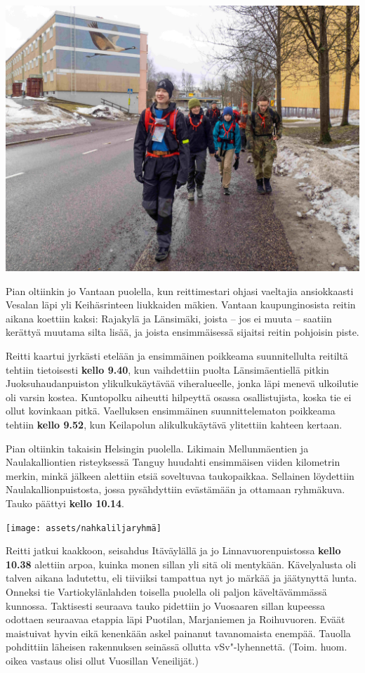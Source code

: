\begin{multicols}{2}
	\vspace*{0.32cm}
	\noindent\includegraphics[width=\linewidth]{assets/nahkaliljavantaa}

	Pian oltiinkin jo Vantaan puolella, kun reittimestari ohjasi vaeltajia
	ansiokkaasti Vesalan läpi yli Keihäsrinteen liukkaiden mäkien. Vantaan
	kaupunginosista reitin aikana koettiin kaksi: Rajakylä ja Länsimäki,
	joista – jos ei muuta – saatiin kerättyä muutama silta lisää, ja joista
	ensimmäisessä sijaitsi reitin pohjoisin piste.

	Reitti kaartui jyrkästi etelään ja ensimmäinen poikkeama suunnitellulta
	reitiltä tehtiin tietoisesti \textbf{kello 9.40}, kun vaihdettiin
	puolta Länsimäentiellä pitkin Juoksuhaudanpuiston ylikulkukäytävää
	viheralueelle, jonka läpi menevä ulkoilutie oli varsin kostea.
	Kuntopolku aiheutti hilpeyttä osassa osallistujista, koska tie ei ollut
	kovinkaan pitkä. Vaelluksen ensimmäinen suunnittelematon poikkeama
	tehtiin \textbf{kello 9.52}, kun Keilapolun alikulkukäytävä ylitettiin
	kahteen kertaan.

	Pian oltiinkin takaisin Helsingin puolella. Likimain Mellunmäentien ja
	Naulakalliontien risteyksessä Tanguy huudahti ensimmäisen viiden
	kilometrin merkin, minkä jälkeen alettiin etsiä soveltuvaa
	taukopaikkaa. Sellainen löydettiin Naulakallionpuistosta, jossa
	pysähdyttiin evästämään ja ottamaan ryhmäkuva. Tauko päättyi
	\textbf{kello 10.14}.

	\vspace*{0.32cm}
	\noindent\texttt{[image: assets/nahkaliljaryhmä]}

	Reitti jatkui kaakkoon, seisahdus Itäväylällä ja jo
	Linnavuorenpuistossa \textbf{kello 10.38} alettiin arpoa, kuinka monen
	sillan yli sitä oli mentykään. Kävelyalusta oli talven aikana
	ladutettu, eli tiiviiksi tampattua nyt jo märkää ja jäätynyttä lunta.
	Onneksi tie Vartiokylänlahden toisella puolella oli paljon
	käveltävämmässä kunnossa. Taktisesti seuraava tauko pidettiin jo
	Vuosaaren sillan kupeessa odottaen seuraavaa etappia läpi Puotilan,
	Marjaniemen ja Roihuvuoren. Eväät maistuivat hyvin eikä kenenkään askel
	painanut tavanomaista enempää. Tauolla pohdittiin läheisen rakennuksen
	seinässä ollutta vSv"-lyhennettä. (Toim. huom. oikea vastaus olisi
	ollut Vuosillan Veneilijät.)


\end{multicols}
